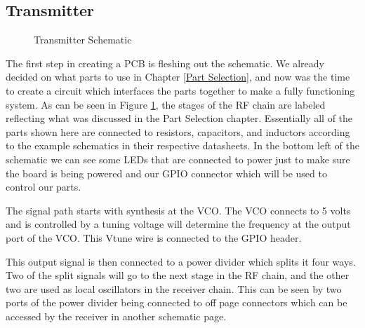 \subsection{Transmitter}
\begin{figure}[H]
  \centering
\caption{Transmitter Schematic}
\label{img:transmitterfull}
\end{figure}
The first step in creating a PCB is fleshing out the schematic. We already decided on what parts to use in Chapter \ref{Part Selection},
and now was the time to create a circuit which interfaces the parts together to make a fully functioning system.
As can be seen in Figure \ref{img:transmitterfull}, the stages of the RF chain are labeled reflecting what was discussed in the
Part Selection chapter. Essentially all of the parts shown here are connected to resistors, capacitors, and inductors according
to the example schematics in their respective datasheets. In the bottom left of the schematic we can see some LEDs
that are connected to power just to make sure the board is being powered and our GPIO connector which will be used to control our
parts. 

The signal path starts with synthesis at the VCO. The VCO connects to 5 volts and is controlled by a tuning voltage will
determine the frequency at the output port of the VCO. This Vtune wire is connected to the GPIO header.

This output signal is then connected to a power divider which splits it four ways. Two of the split signals will
go to the next stage in the RF chain, and the other two are used as local oscillators in the receiver chain. 
This can be seen by two ports of the power divider being connected to off page connectors which can be accessed by the
receiver in another schematic page.

